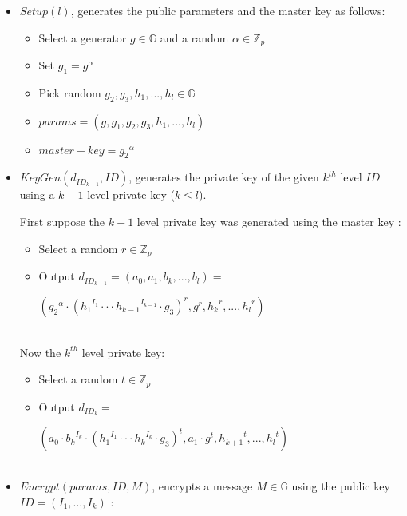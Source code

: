 \begin{itemize}
\item $Setup (l)$, generates the public parameters and the master key as follows:
\begin{itemize}
	\item Select a generator $g \in \mathbb{G}$ and a random $\alpha \in \mathbb{Z}_p$
	\item Set $g_1 = g^{\alpha}$
	\item Pick random $g_2, g_3, h_1, ..., h_l \in \mathbb{G}$
	\item $params = (g, g_1, g_2, g_3, h_1, ..., h_l)$
	\item $master-key = {g_2}^{\alpha}$\\
\end{itemize}	

\item $KeyGen(d_{{ID}_{k-1}}, ID)$, generates the private key of the given $k^{th}$ level $ID$ using a $k-1$ level private key ($k \leq l$).

First suppose the $k-1$ level private key was generated using the master key :
\begin{itemize}
	\item Select a random $r \in \mathbb{Z}_p$ 
	\item Output $d_{{ID}_{k-1}} = (a_0, a_1, b_k, ... , b_l) = $ 
	\begin{center}
	$({{g_2}^{\alpha}} \cdot {({{h_1}^{I_1}\cdot \cdot \cdot {h_{k-1}}^{I_{k-1}}} \cdot {g_3} )}^r , g^r, {h_{k}}^r, ... , {h_l}^r)$\\\
	\end{center}
\end{itemize}	

Now the $k^{th}$ level private key:
\begin{itemize}
	\item Select a random $t \in \mathbb{Z}_p$ 
	\item Output $d_{{ID}_{k}} = $  
	\begin{center}
	$({{a_0}\cdot{{b_k}^{I_k}}} \cdot {({{h_1}^{I_1}\cdot \cdot \cdot {h_k}^{I_k}} \cdot {g_3} )}^t , {a_1}\cdot{g^t}, {h_{k+1}}^t, ... , {h_l}^t)$\\\
	\end{center}
\end{itemize}	

\item $Encrypt (params, ID, M)$, encrypts a message $M \in \mathbb{G}$ using the public key $ID = (I_1, ..., I_k)$ :


\end{itemize}
